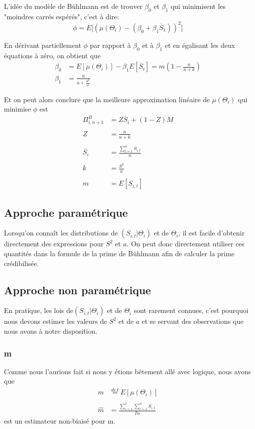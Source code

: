 L'idée du modèle de Bühlmann est de trouver $\beta_0$ et $\beta_1$ qui minimisent les "moindres carrés espérés", c'est à dire:
$$\phi = E\bigg[\left(\mu(\Theta_i)-(\beta_0+\beta_1\overline{S}_1) \right)^2\bigg]$$

En dérivant partiellement $\phi$ par rapport à $\beta_0$ et à $\beta_1$ et en égalisant les deux équations à zéro, on obtient que
$$\boxed{\begin{aligned}
\beta_0 &= E[\mu(\Theta_i)] - \beta_1E[\overline{S}_i] = m\left(1-\frac{n}{n+k}\right) \\
\beta_1 &= \frac{n}{n + \frac{S^2}{a}}
\end{aligned}}$$

Et on peut alors conclure que la meilleure approximation linéaire de $\mu({\Theta_i})$ qui minimise $\phi$ est
$$\boxed{\begin{aligned}
\Pi_{i,n+1}^{B} &=  Z \overline{S}_i + (1-Z)M \\ \\
Z &= \frac{n}{n+k} \\ \\
\overline{S}_i &= \frac{\sum_{t=1}^{n} S_{i,t}}{n} \\ \\
k &= \frac{S^2}{a} \\ \\
m &= E[S_{i,t}]
\end{aligned}}$$

\subsection{ Approche paramétrique}

Lorsqu'on connaît les distributions de $(S_{i,t}|\Theta_i)$ et de $\Theta_i$, il est facile d'obtenir directement des expressions pour $S^2$ et $a$. On peut donc directement utiliser ces quantités dans la formule de la prime de Bühlmann afin de calculer la prime crédibilisée.

\subsection{ Approche non paramétrique}

En pratique, les lois de$(S_{i,t}|\Theta_i)$ et de $\Theta_i$ sont rarement connues, c'est pourquoi nous devons estimer les valeurs de $S^2$ et de $a$ et se servant des observations que nous avons à notre disposition.

\subsubsection{m}
Comme nous l'aurions fait si nous y étions bêtement allé avec logique, nous avons que 
$$\boxed{\begin{aligned}
m &\overset{def}{=} E[\mu(\Theta_i)] \\ \\
\widehat{m} &= \frac{\sum_{i=1}^I \sum_{t=1}^n S_{i,t}}{In}
\end{aligned}}$$
est un estimateur non-biaisé pour m.

